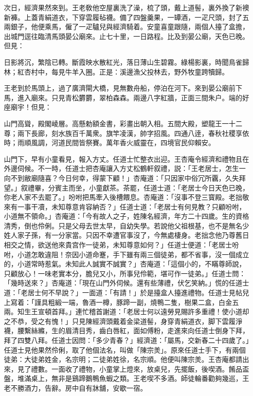 次日，經濟果然來到。王老敎他空屋裏洗了澡，梳了頭，戴上道髻，裏外換了新襖新褲。上蓋青絹道衣，下穿雲履毡襪。備了四盤羹果，一罈酒，一疋尺頭，封了五兩銀子，他便乘馬，僱了一疋驢兒與經濟騎着。安童喜童跟隨，兩個人擡了盒擔，出城門逕往臨清馬頭晏公廟來。止七十里，一日路程。比及到晏公廟，天色已晚。但見：

\begin{myquote}
日影將沉，繁陰已轉。斷霞映水散紅光，落日薄山生碧霧。綠楊影裏，時聞鳥雀歸林；紅杏村中，每見牛羊入圈。正是：溪邊漁父投林去，野外牧童跨犢歸。
\end{myquote}

王老到於馬頭上，過了廣濟閘大橋，見無數舟船，停泊在河下。來到晏公廟前下馬，進入廟來。只見青松欝欝，翠柏森森。兩邊八字紅牆，正面三間朱户。端的好座廟宇！但見：

\begin{myquote}
山門高聳，殿閣崚層。高懸勅額金書，彩畫出朝入相。五間大殿，塑龍王一十二尊；兩下長廊，刻水族百千萬衆。旗竿凌漢，帥字招風。四通八逹，春秋社稷享依時；雨順風調，河道民間皆祭賽。萬年香火威靈在，四境官民仰賴安。
\end{myquote}

山門下，早有小童看見，報入方丈。任道士忙整衣出迎。王杏庵令經濟和禮物且在外邊伺候。不一時，任道士把杏庵讓入方丈松鶴軒叙禮，説：「王老居士，怎生一向不到敝廟隨喜？今日何幸，得蒙下顧！」杏庵道：「只因家中俗冗所覊，久失拜望。」叙禮畢，分賓主而坐，小童獻茶。茶罷，任道士道：「老居士今日天色已晚，你老人家不去罷了。」吩咐把馬牽入後槽餵息。杏庵道：「沒事不登三寳殿。老拙敬來有一事干凟，未知尊意肯容納否？」任道士道：「老居士有何見教？只顧吩咐，小道無不領命。」杏庵道：「今有故人之子，姓陳名經濟，年方二十四歲。生的資格清秀，倒也伶俐。只是父母去世太早，自幼失學。若說他父祖根基，也不是無名少姓人家子孫，有一分家當。只因不幸遭官事沒了，今無處棲身。老拙念他乃尊舊日相交之情，欲送他來貴宫作一徒弟，未知尊意如何？」任道士便道：「老居士吩咐，小道怎敢違阻！奈因小道命蹇，手下雖有兩三個徒弟，都不省事，沒一個成立的，小道常時惹氣。未知此人誠實不誠實？」杏庵道：「這個小的，不瞞尊師說，只顧放心！一味老實本分，膽兒又小，所事兒伶範，堪可作一徒弟。」任道士問：「幾時送來？」杏庵道：「現在山門外伺候。還有些薄禮，伏乞笑納。」慌的任道士道：「老居士何不早說？」一面道：「有請！」於是擡盒人擡進禮物。任道士見帖兒上寫着：「謹具粗緞一端，魯酒一樽，豚蹄一副，燒鴨二隻，樹果二盒，白金五兩。知生王宣頓首拜。」連忙稽首謝道：「老居士何以遠勞見賜許多重禮！使小道却之不恭，受之有愧！」只見陳經濟頭戴着金梁道髻，身穿青絹道衣，脚下雲履淨襪，腰繫絲縧，生的眉清目秀，齒白唇紅，面如傅粉，走進來向任道士倒身下拜，拜了四雙八拜。任道士因問：「多少青春？」經濟道：「屬馬，交新春二十四歲了。」任道士見他果然伶俐，取了他個法名，叫做「陳宗羙」。原來任道士手下，有兩個徒弟：大徒弟姓金，名宗明；二徒弟姓徐，名宗順。他便叫陳宗羙。王杏庵都請出來，見了禮數。一面收了禮物，小童掌上燈來，放桌兒，先擺飯，後喫酒。餚品盃盤，堆滿桌上，無非是鷄蹄鵝鴨魚蝦之類。王老喫不多酒。師徒輪番勸夠幾巡，王老不勝酒力，告辭。房中自有牀舖，安歇一宿。

